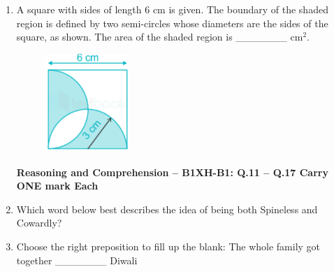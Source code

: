 \documentclass[12pt]{article}
\theoremstyle{remark}
\begin{document}
\begin{enumerate}
\item A square with sides of length 6 cm is given. The boundary of the shaded region is defined by two semi-circles whose diameters are the sides of the square, as shown. The area of the shaded region is \_\_\_\_\_\_\_ cm$^2$.
\begin{figure}[H]
    \centering
    \includegraphics[width=0.3\textwidth]{Figs/Q10.png}
    \caption{}
    \label{fig:4.3}
\end{figure}
\begin{enumerate}
\end{enumerate}
\hfill{}
\newpage
\textbf{Reasoning and Comprehension – B1\newline XH-B1: Q.11 – Q.17 Carry ONE mark Each}
\item Which word below best describes the idea of being both Spineless and Cowardly?
\begin{enumerate}
\end{enumerate}
\hfill{}
\item Choose the right preposition to fill up the blank: The whole family got together \_\_\_\_\_\_\_ Diwali
\begin{enumerate}
\end{enumerate}
\end{enumerate}
\end{document}
